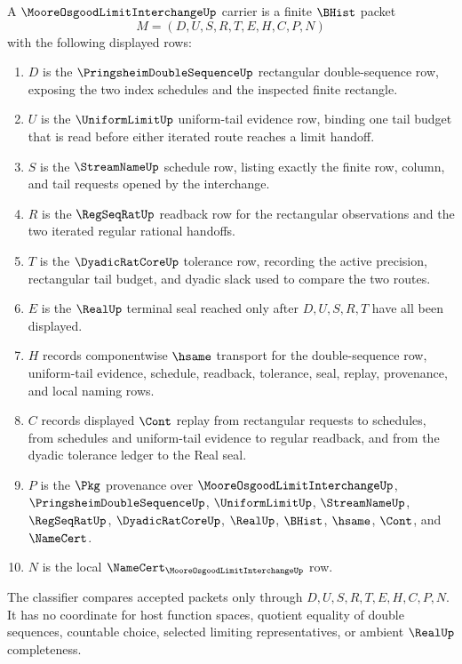 \begin{definition}
\label{def:moore-osgood-limit-interchange-carrier}
A $\MooreOsgoodLimitInterchangeUp$ carrier is a finite $\BHist$ packet
$$
M=(D,U,S,R,T,E,H,C,P,N)
$$
with the following displayed rows:
\begin{enumerate}
\item $D$ is the $\PringsheimDoubleSequenceUp$ rectangular double-sequence row, exposing the two index schedules and the inspected finite rectangle.
\item $U$ is the $\UniformLimitUp$ uniform-tail evidence row, binding one tail budget that is read before either iterated route reaches a limit handoff.
\item $S$ is the $\StreamNameUp$ schedule row, listing exactly the finite row, column, and tail requests opened by the interchange.
\item $R$ is the $\RegSeqRatUp$ readback row for the rectangular observations and the two iterated regular rational handoffs.
\item $T$ is the $\DyadicRatCoreUp$ tolerance row, recording the active precision, rectangular tail budget, and dyadic slack used to compare the two routes.
\item $E$ is the $\RealUp$ terminal seal reached only after $D,U,S,R,T$ have all been displayed.
\item $H$ records componentwise $\hsame$ transport for the double-sequence row, uniform-tail evidence, schedule, readback, tolerance, seal, replay, provenance, and local naming rows.
\item $C$ records displayed $\Cont$ replay from rectangular requests to schedules, from schedules and uniform-tail evidence to regular readback, and from the dyadic tolerance ledger to the Real seal.
\item $P$ is the $\Pkg$ provenance over $\MooreOsgoodLimitInterchangeUp$, $\PringsheimDoubleSequenceUp$, $\UniformLimitUp$, $\StreamNameUp$, $\RegSeqRatUp$, $\DyadicRatCoreUp$, $\RealUp$, $\BHist$, $\hsame$, $\Cont$, and $\NameCert$.
\item $N$ is the local $\NameCert_{\MooreOsgoodLimitInterchangeUp}$ row.
\end{enumerate}
The classifier compares accepted packets only through $D,U,S,R,T,E,H,C,P,N$. It has no coordinate for host function spaces, quotient equality of double sequences, countable choice, selected limiting representatives, or ambient $\RealUp$ completeness.
\end{definition}


